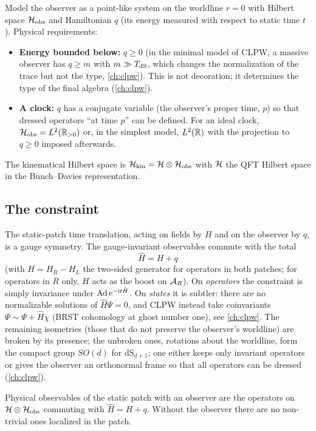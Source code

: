 Model the observer as a point-like system on the worldline $r=0$ with Hilbert space $\mathcal{H}_{\rm obs}$ and Hamiltonian $q$ (its energy measured with respect to static time $t$). Physical requirements:
\begin{itemize}
\item \textbf{Energy bounded below:} $q\ge0$ (in the minimal model of CLPW; a massive observer has $q\ge m$ with $m\gg T_{\rm dS}$, which changes the normalization of the trace but not the type, \cref{ch:clpw}). This is not decoration; it determines the type of the final algebra (\cref{ch:clpw}).
\item \textbf{A clock:} $q$ has a conjugate variable (the observer's proper time, $p$) so that dressed operators ``at time $p$'' can be defined. For an ideal clock, $\mathcal{H}_{\rm obs}=L^2(\mathbb{R}_{>0})$ or, in the simplest model, $L^2(\mathbb{R})$ with the projection to $q\ge0$ imposed afterwards.
\end{itemize}
The kinematical Hilbert space is $\mathcal{H}_{\rm kin}=\mathcal{H}\otimes\mathcal{H}_{\rm obs}$ with $\mathcal{H}$ the QFT Hilbert space in the Bunch--Davies representation.

\subsection{The constraint}

The static-patch time translation, acting on fields by $H$ and on the observer by $q$, is a gauge symmetry. The gauge-invariant observables commute with the total
\begin{equation}
\hat H=H+q
\end{equation}
(with $H=H_R-H_L$ the two-sided generator for operators in both patches; for operators in $R$ only, $H$ acts as the boost on $\mathcal{A}_R$). On \emph{operators} the constraint is simply invariance under $\operatorname{Ad}\mathrm{e}^{-\mathrm{i} t\hat H}$. On \emph{states} it is subtler: there are no normalizable solutions of $\hat H\Psi=0$, and CLPW instead take coinvariants $\Psi\sim\Psi+\hat H\chi$ (BRST cohomology at ghost number one), see \cref{ch:clpw}. The remaining isometries (those that do not preserve the observer's worldline) are broken by its presence; the unbroken ones, rotations about the worldline, form the compact group $SO(d)$ for $\mathrm{dS}_{d+1}$; one either keeps only invariant operators or gives the observer an orthonormal frame so that all operators can be dressed (\cref{ch:clpw}).

\begin{keyidea}
Physical observables of the static patch with an observer are the operators on $\mathcal{H}\otimes\mathcal{H}_{\rm obs}$ commuting with $\hat H=H+q$. Without the observer there are no non-trivial ones localized in the patch.
\end{keyidea}

